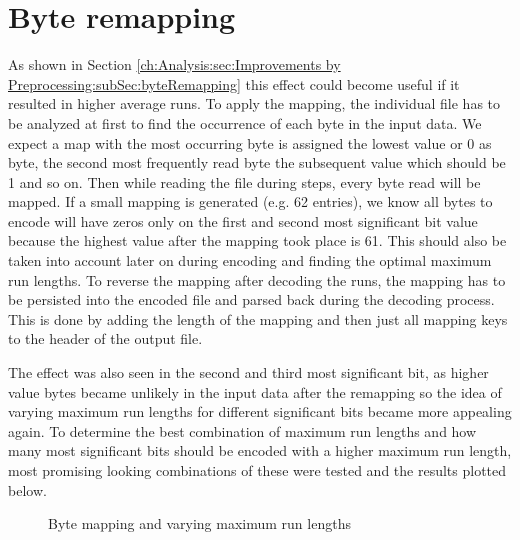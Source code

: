 \section{Byte remapping}
\par{
As shown in Section \ref{ch:Analysis:sec:Improvements by Preprocessing:subSec:byteRemapping} this effect could become useful if it resulted in higher average runs. To apply the mapping, the individual file has to be analyzed at first to find the occurrence of each byte in the input data. We expect a map with the most occurring byte is assigned the lowest value or 0 as byte, the second most frequently read byte the subsequent value which should be 1 and so on. Then while reading the file during steps, every byte read will be mapped. If a small mapping is generated (e.g. 62 entries), we know all bytes to encode will have zeros only on the first and second most significant bit value because the highest value after the mapping took place is 61. This should also be taken into account later on during encoding and finding the optimal maximum run lengths.
To reverse the mapping after decoding the runs, the mapping has to be persisted into the encoded file and parsed back during the decoding process. This is done by adding the length of the mapping and then just all mapping keys to the header of the output file. 
}
\par{
The effect was also seen in the second and third most significant bit, as higher value bytes became unlikely in the input data after the remapping so the idea of varying maximum run lengths for different significant bits became more appealing again. To determine the best combination of maximum run lengths and how many most significant bits should be encoded with a higher maximum run length, most promising looking combinations of these were tested and the results plotted below.
}
\begin{figure}[h]
\caption{Byte mapping and varying maximum run lengths}
\label{fig:2:Byte mapping and varying maximum run lengths}
\end{figure}

